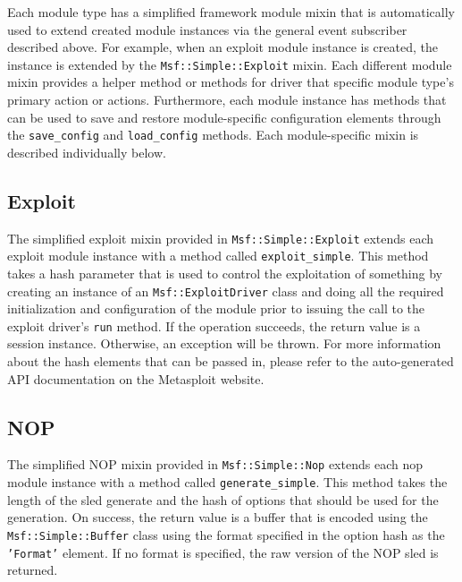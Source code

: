 \documentclass{report}
\begin{document}
\par
Each module type has a simplified framework module mixin that is
automatically used to extend created module instances via the
general event subscriber described above.  For example, when an
exploit module instance is created, the instance is extended by the
\texttt{Msf::Simple::Exploit} mixin.  Each different module mixin
provides a helper method or methods for driver that specific module
type's primary action or actions.  Furthermore, each module instance
has methods that can be used to save and restore module-specific
configuration elements through the \texttt{save\_config} and
\texttt{load\_config} methods.  Each module-specific mixin is
described individually below.

        \subsection{Exploit}

\par
The simplified exploit mixin provided in
\texttt{Msf::Simple::Exploit} extends each exploit module instance
with a method called \texttt{exploit\_simple}.  This method takes a
hash parameter that is used to control the exploitation of something
by creating an instance of an \texttt{Msf::ExploitDriver} class and
doing all the required initialization and configuration of the
module prior to issuing the call to the exploit driver's
\texttt{run} method.  If the operation succeeds, the return value is
a session instance.  Otherwise, an exception will be thrown.  For
more information about the hash elements that can be passed in,
please refer to the auto-generated API documentation on the
Metasploit website.

        \subsection{NOP}

\par
The simplified NOP mixin provided in \texttt{Msf::Simple::Nop}
extends each nop module instance with a method called
\texttt{generate\_simple}.  This method takes the length of the sled
generate and the hash of options that should be used for the
generation.  On success, the return value is a buffer that is
encoded using the \texttt{Msf::Simple::Buffer} class using the
format specified in the option hash as the \texttt{'Format'}
element.  If no format is specified, the raw version of the NOP sled
is returned.
\end{document}
